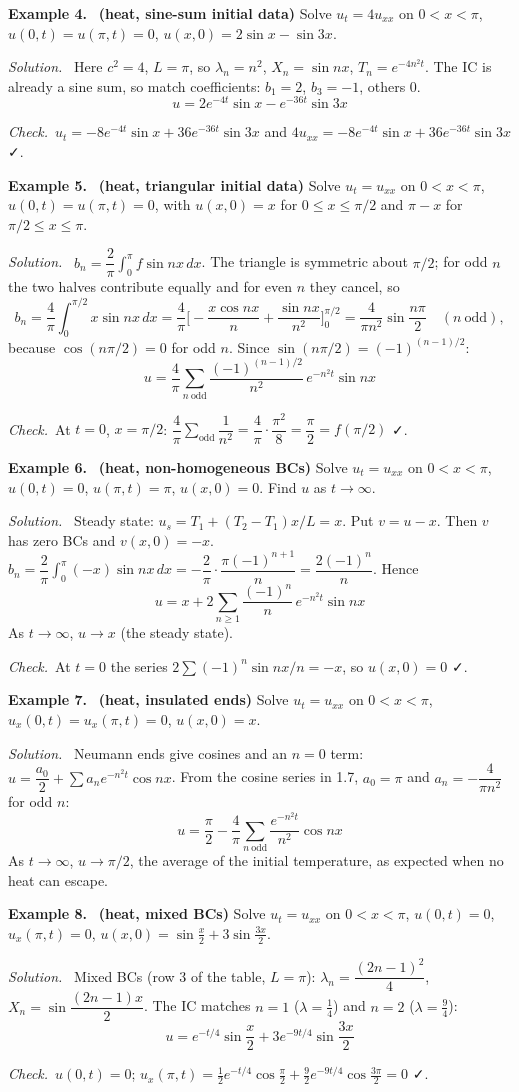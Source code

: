 \documentclass[11pt]{article}
\newcommand{\ex}[1]{\Needspace{7\baselineskip}\vspace{0.9em}\par\noindent\textbf{Example #1.}\ }
\newcommand{\sol}{\par\vspace{2pt}\noindent\textit{Solution.}\ }
\newcommand{\chk}{\par\noindent\textit{Check.}\ }
\begin{document}
\ex{4}
\textbf{(heat, sine-sum initial data)} Solve $u_t=4u_{xx}$ on $0<x<\pi$, $u(0,t)=u(\pi,t)=0$, $u(x,0)=2\sin x-\sin3x$.
\sol
Here $c^2=4$, $L=\pi$, so $\lambda_n=n^2$, $X_n=\sin nx$, $T_n=e^{-4n^2t}$. The IC is already a sine sum, so match coefficients: $b_1=2$, $b_3=-1$, others $0$.
\[
\boxed{u=2e^{-4t}\sin x-e^{-36t}\sin3x}
\]
\chk $u_t=-8e^{-4t}\sin x+36e^{-36t}\sin3x$ and $4u_{xx}=-8e^{-4t}\sin x+36e^{-36t}\sin3x$ ✓.

\ex{5}
\textbf{(heat, triangular initial data)} Solve $u_t=u_{xx}$ on $0<x<\pi$, $u(0,t)=u(\pi,t)=0$, with $u(x,0)=x$ for $0\le x\le\pi/2$ and $\pi-x$ for $\pi/2\le x\le\pi$.
\sol
$b_n=\dfrac2\pi\displaystyle\int_0^\pi f\sin nx\,dx$. The triangle is symmetric about $\pi/2$; for odd $n$ the two halves contribute equally and for even $n$ they cancel, so
\[
b_n=\frac4\pi\int_0^{\pi/2}x\sin nx\,dx=\frac4\pi\Big[-\frac{x\cos nx}{n}+\frac{\sin nx}{n^2}\Big]_0^{\pi/2}=\frac{4}{\pi n^2}\sin\frac{n\pi}{2}\quad(n\ \text{odd}),
\]
because $\cos(n\pi/2)=0$ for odd $n$. Since $\sin(n\pi/2)=(-1)^{(n-1)/2}$:
\[
\boxed{u=\frac4\pi\sum_{n\ \mathrm{odd}}\frac{(-1)^{(n-1)/2}}{n^2}\,e^{-n^2t}\sin nx}
\]
\chk At $t=0$, $x=\pi/2$: $\dfrac4\pi\sum_{\mathrm{odd}}\dfrac1{n^2}=\dfrac4\pi\cdot\dfrac{\pi^2}{8}=\dfrac\pi2=f(\pi/2)$ ✓.

\ex{6}
\textbf{(heat, non-homogeneous BCs)} Solve $u_t=u_{xx}$ on $0<x<\pi$, $u(0,t)=0$, $u(\pi,t)=\pi$, $u(x,0)=0$. Find $u$ as $t\to\infty$.
\sol
Steady state: $u_s=T_1+(T_2-T_1)x/L=x$. Put $v=u-x$. Then $v$ has zero BCs and $v(x,0)=-x$.
$b_n=\dfrac2\pi\displaystyle\int_0^\pi(-x)\sin nx\,dx=-\dfrac2\pi\cdot\dfrac{\pi(-1)^{n+1}}{n}=\dfrac{2(-1)^n}{n}$. Hence
\[
\boxed{u=x+2\sum_{n\ge1}\frac{(-1)^n}{n}\,e^{-n^2t}\sin nx}
\]
As $t\to\infty$, $u\to x$ (the steady state).
\chk At $t=0$ the series $2\sum(-1)^n\sin nx/n=-x$, so $u(x,0)=0$ ✓.

\ex{7}
\textbf{(heat, insulated ends)} Solve $u_t=u_{xx}$ on $0<x<\pi$, $u_x(0,t)=u_x(\pi,t)=0$, $u(x,0)=x$.
\sol
Neumann ends give cosines and an $n=0$ term: $u=\dfrac{a_0}{2}+\sum a_n e^{-n^2t}\cos nx$. From the cosine series in 1.7, $a_0=\pi$ and $a_n=-\dfrac{4}{\pi n^2}$ for odd $n$:
\[
\boxed{u=\frac\pi2-\frac4\pi\sum_{n\ \mathrm{odd}}\frac{e^{-n^2t}}{n^2}\cos nx}
\]
As $t\to\infty$, $u\to\pi/2$, the average of the initial temperature, as expected when no heat can escape.

\ex{8}
\textbf{(heat, mixed BCs)} Solve $u_t=u_{xx}$ on $0<x<\pi$, $u(0,t)=0$, $u_x(\pi,t)=0$, $u(x,0)=\sin\frac x2+3\sin\frac{3x}{2}$.
\sol
Mixed BCs (row 3 of the table, $L=\pi$): $\lambda_n=\dfrac{(2n-1)^2}{4}$, $X_n=\sin\dfrac{(2n-1)x}{2}$. The IC matches $n=1$ ($\lambda=\tfrac14$) and $n=2$ ($\lambda=\tfrac94$):
\[
\boxed{u=e^{-t/4}\sin\frac x2+3e^{-9t/4}\sin\frac{3x}{2}}
\]
\chk $u(0,t)=0$; $u_x(\pi,t)=\tfrac12e^{-t/4}\cos\frac\pi2+\tfrac92e^{-9t/4}\cos\frac{3\pi}{2}=0$ ✓.
\end{document}
